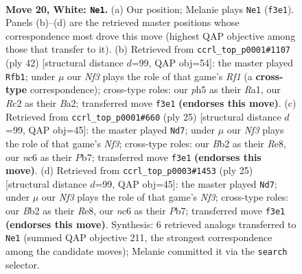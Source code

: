 \documentclass[11pt]{article}
\begin{document}
\clearpage

\begin{figure}[p]\centering
\begin{subfigure}{0.46\textwidth}\centering
\resizebox{\linewidth}{!}{%
\newchessgame
\chessboard[
  setfen={2rqr3/4bp1k/2n2np1/p6p/1p1p4/1P1P1NP1/PBR1QP1P/RN4K1 w - - 8 20},
  showmover=false,
  pgfstyle=straightmove, color=movearrow, markmove={f3-e1}
]}
\caption{}
\end{subfigure}\hfill
\begin{subfigure}{0.46\textwidth}\centering
\resizebox{\linewidth}{!}{%
\newchessgame
\chessboard[
  setfen={r2qrbk1/5p1p/4nnp1/p2pp3/8/P2PBQNP/B1P2PP1/R4RK1 w - - 1 22},
  showmover=false,
  pgfstyle=straightmove, color=movearrow, markmove={f1-b1}
]}
\caption{}
\end{subfigure}
\\[4pt]
\begin{subfigure}{0.46\textwidth}\centering
\resizebox{\linewidth}{!}{%
\newchessgame
\chessboard[
  setfen={r2qr1k1/pp3pbp/n1pp1np1/8/2PNP3/2N1BP2/PP2Q1PP/3RR1K1 b - - 1 13},
  showmover=false,
  pgfstyle=straightmove, color=movearrow, markmove={f6-d7}
]}
\caption{}
\end{subfigure}\hfill
\begin{subfigure}{0.46\textwidth}\centering
\resizebox{\linewidth}{!}{%
\newchessgame
\chessboard[
  setfen={r2qr1k1/pp3pbp/n1pp1np1/8/2PNP3/2N1BP2/PP2Q1PP/3RR1K1 b - - 1 13},
  showmover=false,
  pgfstyle=straightmove, color=movearrow, markmove={f6-d7}
]}
\caption{}
\end{subfigure}
\caption{\textbf{Move 20, White: \texttt{Ne1}.} (a) Our position; Melanie plays \texttt{Ne1} (\texttt{f3e1}). Panels (b)--(d) are the retrieved master positions whose correspondence most drove this move (highest QAP objective among those that transfer to it). (b) Retrieved from \texttt{ccrl\_top\_p0001\#1107} (ply 42) [structural distance $d$=99, QAP obj=54]: the master played \texttt{Rfb1}; under $\mu$ our \emph{Nf3} plays the role of that game's \emph{Rf1} (a \textbf{cross-type} correspondence); cross-type roles: our \emph{p}h5 as their \emph{R}a1, our \emph{R}c2 as their \emph{B}a2; transferred move \texttt{f3e1} \textbf{(endorses this move)}. (c) Retrieved from \texttt{ccrl\_top\_p0001\#660} (ply 25) [structural distance $d$=99, QAP obj=45]: the master played \texttt{Nd7}; under $\mu$ our \emph{Nf3} plays the role of that game's \emph{Nf3}; cross-type roles: our \emph{B}b2 as their \emph{R}e8, our \emph{n}c6 as their \emph{P}b7; transferred move \texttt{f3e1} \textbf{(endorses this move)}. (d) Retrieved from \texttt{ccrl\_top\_p0003\#1453} (ply 25) [structural distance $d$=99, QAP obj=45]: the master played \texttt{Nd7}; under $\mu$ our \emph{Nf3} plays the role of that game's \emph{Nf3}; cross-type roles: our \emph{B}b2 as their \emph{R}e8, our \emph{n}c6 as their \emph{P}b7; transferred move \texttt{f3e1} \textbf{(endorses this move)}. Synthesis: 6 retrieved analogs transferred to \texttt{Ne1} (summed QAP objective 211, the strongest correspondence among the candidate moves); Melanie committed it via the \texttt{search} selector.}
\label{fig:thought-m38}
\end{figure}
\end{document}
